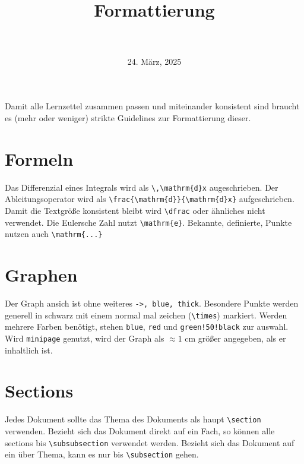 \documentclass{article}
\title{
 \LARGE{\textls[200]{Guidelines}} \\
 \normalsize{\textls[250]{für die}} \\ [-0.7em]
 \LARGE{Formattierung} \\
 \normalsize{\textls[250]{der}} \\ [-0.7em]
 \LARGE{\textls[200]{Lernzettel}} 
}
\date{24. März, 2025}
\begin{document}
 
\maketitle
 
\noindent Damit alle Lernzettel zusammen passen und miteinander konsistent sind braucht es (mehr oder weniger) strikte Guidelines zur Formattierung dieser.
 
\section{Formeln}
Das Differenzial eines Integrals wird als \verb|\,\mathrm{d}x| augeschrieben. Der Ableitungsoperator wird als \verb|\frac{\mathrm{d}}{\mathrm{d}x}| aufgeschrieben. \newline
Damit die Textgröße konsistent bleibt wird \verb|\dfrac| oder ähnliches nicht verwendet. \newline
Die Eulersche Zahl nutzt \verb|\mathrm{e}|. Bekannte, definierte, Punkte nutzen auch \verb|\mathrm{...}|
 
\section{Graphen}
Der Graph ansich ist ohne weiteres \verb|->, blue, thick|. Besondere Punkte werden generell in schwarz mit einem normal mal zeichen (\verb|\times|) markiert. Werden mehrere Farben benötigt, stehen \verb|blue|, \verb|red| und \verb|green!50!black| zur auswahl. \newline
Wird \verb|minipage| genutzt, wird der Graph als $\approx 1$ cm größer angegeben, als er inhaltlich ist. 
 
\section{Sections}
Jedes Dokument sollte das Thema des Dokuments als haupt \verb|\section| verwenden. Bezieht sich das Dokument direkt auf ein Fach, so können alle sections bis \verb|\subsubsection| verwendet werden. Bezieht sich das Dokument auf ein über Thema, kann es nur bis \verb|\subsection| gehen.
 
\end{document}
